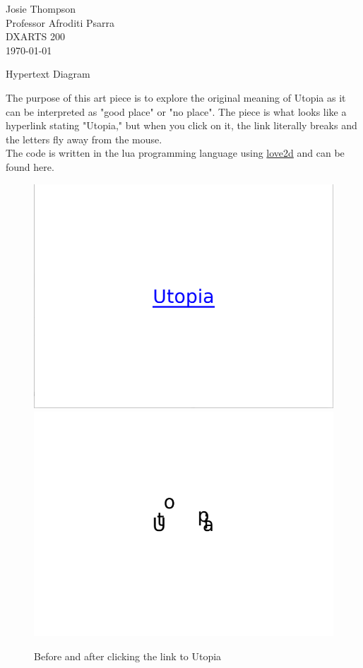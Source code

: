 \documentclass[12pt]{article}
\begin{document}
\begin{flushleft}

    Josie Thompson\\
    Professor Afroditi Psarra\\
    DXARTS 200\\
    \mydate \today\\

\end{flushleft}

\begin{center}
    Hypertext Diagram
\end{center}

The purpose of this art piece is to explore the original meaning of Utopia as it can be interpreted as "good place" or "no place". The piece is what looks like a hyperlink stating "Utopia," but when you click on it, the link literally breaks and the letters fly away from the mouse.\\
The code is written in the lua programming language using \href{https://love2d.org/wiki/Main_Page}{love2d} and can be found here.

\begin{figure}[H]
    \centering
    \includegraphics{utopia-2.png}
    \includegraphics{utopia-3.png}
    \caption{Before and after clicking the link to Utopia}
\end{figure}
\end{document}

